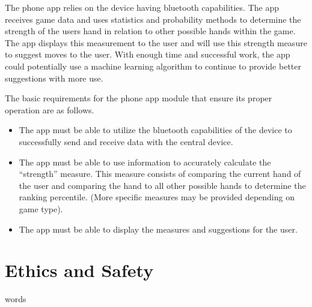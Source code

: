 \documentclass[12pt]{article}
\begin{document}
The phone app relies on the device having bluetooth capabilities. The app receives game data and uses statistics and probability methods to determine the strength of the users hand in relation to other possible hands within the game. The app displays this measurement to the user and will use this strength measure to suggest moves to the user. With enough time and successful work, the app could potentially use a machine learning algorithm to continue to provide better suggestions with more use. 

The basic requirements for the phone app module that ensure its proper operation are as follows.

\begin{itemize}
\item The app must be able to utilize the bluetooth capabilities of the device to successfully send and receive data with the central device.
\item The app must be able to use information to accurately calculate the ``strength'' measure. This measure consists of comparing the current hand of the user and comparing the hand to all other possible hands to determine the ranking percentile. (More specific measures may be provided depending on game type).
\item The app must be able to display the measures and suggestions for the user.
\end{itemize}

\section{Ethics and Safety}

words

\cite{Pozar}




\end{document}
